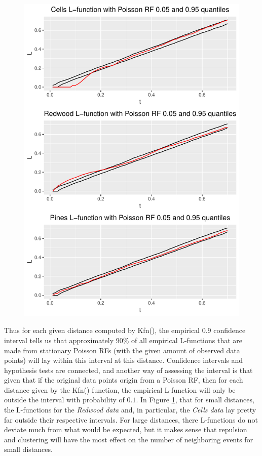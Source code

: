 \begin{figure}
    \centering
    \includegraphics[scale=0.95]{figures/prob1_quantiles.pdf}
    \caption{}
    \label{fig:poiss_quantiles}
\end{figure}

Thus for each given distance computed by Kfn(), the empirical $0.9$ confidence interval tells us that approximately $90\%$ of all empirical L-functions that are made from stationary Poisson RFs (with the given amount of observed data points) will lay within this interval at this distance. Confidence intervals and hypothesis tests are connected, and another way of assessing the interval is that given that if the original data points origin from a Poisson RF, then for each distance given by the Kfn() function, the empirical L-function will only be outside the interval with probability of $0.1$. In Figure \ref{fig:poiss_quantiles}, that for small distances, the L-functions for the \textit{Redwood data} and, in particular, the \textit{Cells data} lay pretty far outside their respective intervals. For large distances, there L-functions do not deviate much from what would be expected, but it makes sense that repulsion and clustering will have the most effect on the number of neighboring events for small distances.

